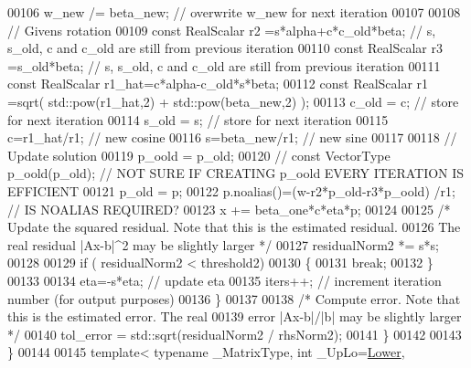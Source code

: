 \begin{DoxyCode}
00106                 w\_new /= beta\_new; \textcolor{comment}{// overwrite w\_new for next iteration}
00107                 
00108                 \textcolor{comment}{// Givens rotation}
00109                 \textcolor{keyword}{const} RealScalar r2 =s*alpha+c*c\_old*beta; \textcolor{comment}{// s, s\_old, c and c\_old are still from previous
       iteration}
00110                 \textcolor{keyword}{const} RealScalar r3 =s\_old*beta; \textcolor{comment}{// s, s\_old, c and c\_old are still from previous iteration}
00111                 \textcolor{keyword}{const} RealScalar r1\_hat=c*alpha-c\_old*s*beta;
00112                 \textcolor{keyword}{const} RealScalar r1 =sqrt( std::pow(r1\_hat,2) + std::pow(beta\_new,2) );
00113                 c\_old = c; \textcolor{comment}{// store for next iteration}
00114                 s\_old = s; \textcolor{comment}{// store for next iteration}
00115                 c=r1\_hat/r1; \textcolor{comment}{// new cosine}
00116                 s=beta\_new/r1; \textcolor{comment}{// new sine}
00117                 
00118                 \textcolor{comment}{// Update solution}
00119                 p\_oold = p\_old;
00120 \textcolor{comment}{//                const VectorType p\_oold(p\_old); // NOT SURE IF CREATING p\_oold EVERY ITERATION IS
       EFFICIENT}
00121                 p\_old = p;
00122                 p.noalias()=(w-r2*p\_old-r3*p\_oold) /r1; \textcolor{comment}{// IS NOALIAS REQUIRED?}
00123                 x += beta\_one*c*eta*p;
00124                 
00125                 \textcolor{comment}{/* Update the squared residual. Note that this is the estimated residual.}
00126 \textcolor{comment}{                The real residual |Ax-b|^2 may be slightly larger */}
00127                 residualNorm2 *= s*s;
00128                 
00129                 \textcolor{keywordflow}{if} ( residualNorm2 < threshold2)
00130                 \{
00131                     \textcolor{keywordflow}{break};
00132                 \}
00133                 
00134                 eta=-s*eta; \textcolor{comment}{// update eta}
00135                 iters++; \textcolor{comment}{// increment iteration number (for output purposes)}
00136             \}
00137             
00138             \textcolor{comment}{/* Compute error. Note that this is the estimated error. The real }
00139 \textcolor{comment}{             error |Ax-b|/|b| may be slightly larger */}
00140             tol\_error = std::sqrt(residualNorm2 / rhsNorm2);
00141         \}
00142         
00143     \}
00144     
00145     \textcolor{keyword}{template}< \textcolor{keyword}{typename} \_MatrixType, \textcolor{keywordtype}{int} \_UpLo=\hyperlink{group__enums_gga39e3366ff5554d731e7dc8bb642f83cda891792b8ed394f7607ab16dd716f60e6}{Lower},

\end{DoxyCode}
